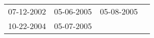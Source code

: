 \begin{supertabular}{llll}
 07-12-2002 &  05-06-2005 &  05-08-2005 \\
 10-22-2004 &  05-07-2005 &             \\
\end{supertabular}
